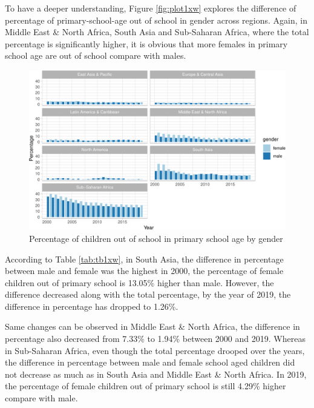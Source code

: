 \documentclass[11pt,a4paper,]{article}
\begin{document}
To have a deeper understanding, Figure \ref{fig:plot1xw} explores the difference of percentage of primary-school-age out of school in gender across regions. Again, in Middle East \& North Africa, South Asia and Sub-Saharan Africa, where the total percentage is significantly higher, it is obvious that more females in primary school age are out of school compare with males.

\begin{figure}[H]
\includegraphics{report_files/figure-latex/plot2xw-1} \caption{Percentage of children out of school in primary school age by gender}\label{fig:plot2xw}
\end{figure}

According to Table \ref{tab:tb1xw}, in South Asia, the difference in percentage between male and female was the highest in 2000, the percentage of female children out of primary school is 13.05\% higher than male. However, the difference decreased along with the total percentage, by the year of 2019, the difference in percentage has dropped to 1.26\%.

Same changes can be observed in Middle East \& North Africa, the difference in percentage also decreased from 7.33\% to 1.94\% between 2000 and 2019. Whereas in Sub-Saharan Africa, even though the total percentage drooped over the years, the difference in percentage between male and female school aged children did not decrease as much as in South Asia and Middle East \& North Africa. In 2019, the percentage of female children out of primary school is still 4.29\% higher compare with male.
\end{document}
